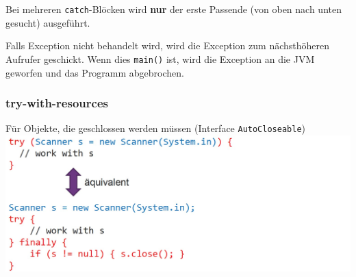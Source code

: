 Bei mehreren \verb|catch|-Blöcken wird \textbf{nur} der erste Passende (von oben nach unten gesucht) ausgeführt. 

Falls Exception nicht behandelt wird, wird die Exception zum nächsthöheren Aufrufer geschickt. 
Wenn dies \verb|main()| ist, wird die Exception an die JVM geworfen und das Programm abgebrochen.

\subsubsection{try-with-resources}
Für Objekte, die geschlossen werden müssen (Interface \verb|AutoCloseable|)\\
\includegraphics[width=\linewidth]{pictures/try-with-resources.jpg}
